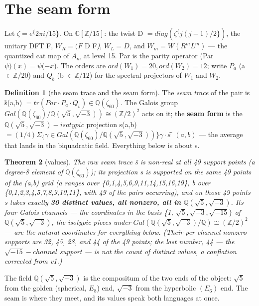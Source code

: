 \documentclass[11pt]{article}
\theoremstyle{plain}
\newtheorem{theorem}{Theorem}[section]
\theoremstyle{definition}
\newtheorem{definition}[theorem]{Definition}
\theoremstyle{remark}
\begin{document}
\section{The seam form}

Let \(\zeta  = e^\{2\pi i/15\}\). On \(\mathbb{C}[\mathbb{Z}/15]\): the twist D \(= diag(\zeta ^\{j(j-1)/2\})\), the unitary DFT F, \(W_{R} = (F\) D F\emph{)}, \(W_{L} = D\), and \(W_{m} = W(R^{m} L^{m})\) — the quantized cat map of \(A_{m}\) at level 15. Par is the parity operator (Par \(\psi )(x) = \psi (-x\)). The orders are \(ord(W_{1}) = 20, ord(W_{2}) = 12\); write \(P_{a}\) (a \(\in  \mathbb{Z}/20\)) and \(Q_{b}\) (b \(\in  \mathbb{Z}/12\)) for the spectral projectors of \(W_{1}\) and \(W_{2}\).

\begin{definition}[the seam trace and the seam form]
The \emph{seam trace} of the pair is s̃(a,b) \(= tr(Par\cdot P_{a}\cdot Q_{b}) \in  \mathbb{Q}(\zeta _{60})\). The Galois group \(Gal(\mathbb{Q}(\zeta _{60})/\mathbb{Q}(\sqrt{5},\sqrt{-3})) \cong  (\mathbb{Z}/2)^{2}\) acts on it; the \textbf{seam form} is the \(\mathbb{Q}(\sqrt{5},\sqrt{-3})-isotypic\) projection s(a,b) \(= (1/4) \Sigma _\{\gamma  \in  Gal(\mathbb{Q}(\zeta _{60})/\mathbb{Q}(\sqrt{5},\sqrt{-3}))\} \gamma \cdot s̃(a,b)\) — the average that lands in the biquadratic field. Everything below is about s.
\end{definition}

\begin{theorem}[values]
The raw seam trace s̃ is non-real at all 49 support points (a degree-8 element of \(\mathbb{Q}(\zeta _{60})\)); its projection s is supported on the same 49 points of the (a,b) grid (a ranges over \{0,1,4,5,6,9,11,14,15,16,19\}, b over \{0,1,2,3,4,5,7,8,9,10,11\}, with 49 of the pairs occurring), and on those 49 points s takes exactly \textbf{30 distinct values, all nonzero, all in \(\mathbb{Q}(\sqrt{5}, \sqrt{-3})\)}. Its four Galois channels — the coordinates in the basis \{1, \(\sqrt{5}, \sqrt{-3}, \sqrt{-15}\}\) of \(\mathbb{Q}(\sqrt{5},\sqrt{-3})\), the isotypic pieces under \(Gal(\mathbb{Q}(\sqrt{5},\sqrt{-3})/\mathbb{Q}) \cong  (\mathbb{Z}/2)^{2}\) — are the natural coordinates for everything below. (Their per-channel nonzero supports are 32, 45, 28, and 44 of the 49 points; the last number, 44 — the \(\sqrt{-15}-channel\) support — is \emph{not} the count of distinct values, a conflation corrected from v1.)
\end{theorem}

The field \(\mathbb{Q}(\sqrt{5},\sqrt{-3})\) is the compositum of the two ends of the object: \(\sqrt{5}\) from the golden (spherical, \(E_{8}\)) end, \(\sqrt{-3}\) from the hyperbolic \((E_{6})\) end. The seam is where they meet, and its values speak both languages at once.
\end{document}
